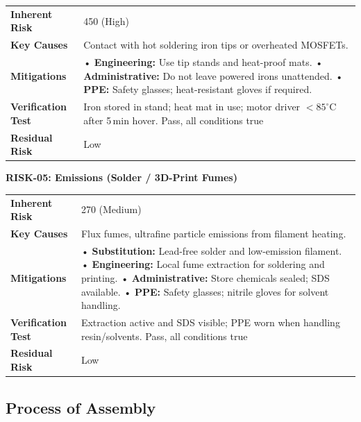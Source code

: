 \begin{tabular}{@{}p{3cm}p{13cm}@{}}
\toprule
\textbf{Inherent Risk} & 450 (High) \\
\textbf{Key Causes} & Contact with hot soldering iron tips or overheated MOSFETs. \\
\textbf{Mitigations} &
• \textbf{Engineering:} Use tip stands and heat-proof mats. \newline
• \textbf{Administrative:} Do not leave powered irons unattended. \newline
• \textbf{PPE:} Safety glasses; heat-resistant gloves if required. \\
\textbf{Verification Test} & Iron stored in stand; heat mat in use; motor driver $<85^\circ$C after 5\,min hover. Pass, all conditions true \\
\textbf{Residual Risk} & Low \\
\bottomrule
\end{tabular}
\vspace{0.6em}

\pagebreak
\textbf{RISK-05: Emissions (Solder / 3D-Print Fumes)}

\begin{tabular}{@{}p{3cm}p{13cm}@{}}
\toprule
\textbf{Inherent Risk} & 270 (Medium) \\
\textbf{Key Causes} & Flux fumes, ultrafine particle emissions from filament heating. \\
\textbf{Mitigations} &
• \textbf{Substitution:} Lead-free solder and low-emission filament. \newline
• \textbf{Engineering:} Local fume extraction for soldering and printing. \newline
• \textbf{Administrative:} Store chemicals sealed; SDS available. \newline
• \textbf{PPE:} Safety glasses; nitrile gloves for solvent handling. \\
\textbf{Verification Test} & Extraction active and SDS visible; PPE worn when handling resin/solvents. Pass, all conditions true \\
\textbf{Residual Risk} & Low \\
\bottomrule
\end{tabular}

\subsection{Process of Assembly}

